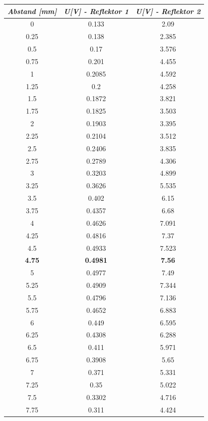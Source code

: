 \documentclass[a4paper,12pt]{article}
\begin{document}
	\begin{longtable}[h]{|c|c|c|}
			\hline
			\multicolumn{1}{|l|}{\textit{Abstand [mm]}} & \multicolumn{1}{l|}{\textit{U[V] - Reflektor 1}} & \multicolumn{1}{l|}{\textit{U[V] - Reflektor 2}} \\ \hline
			0 & 0.133 & 2.09 \\ \hline
			0.25 & 0.138 & 2.385 \\ \hline
			0.5 & 0.17 & 3.576 \\ \hline
			0.75 & 0.201 & 4.455 \\ \hline
			1 & 0.2085 & 4.592 \\ \hline
			1.25 & 0.2 & 4.258 \\ \hline
			1.5 & 0.1872 & 3.821 \\ \hline
			1.75 & 0.1825 & 3.503 \\ \hline
			2 & 0.1903 & 3.395 \\ \hline
			2.25 & 0.2104 & 3.512 \\ \hline
			2.5 & 0.2406 & 3.835 \\ \hline
			2.75 & 0.2789 & 4.306 \\ \hline
			3 & 0.3203 & 4.899 \\ \hline
			3.25 & 0.3626 & 5.535 \\ \hline
			3.5 & 0.402 & 6.15 \\ \hline
			3.75 & 0.4357 & 6.68 \\ \hline
			4 & 0.4626 & 7.091 \\ \hline
			4.25 & 0.4816 & 7.37 \\ \hline
			4.5 & 0.4933 & 7.523 \\ \hline
			\textbf{4.75} & \textbf{0.4981} & \textbf{7.56} \\ \hline
			5 & 0.4977 & 7.49 \\ \hline
			5.25 & 0.4909 & 7.344 \\ \hline
			5.5 & 0.4796 & 7.136 \\ \hline
			5.75 & 0.4652 & 6.883 \\ \hline
			6 & 0.449 & 6.595 \\ \hline
			6.25 & 0.4308 & 6.288 \\ \hline
			6.5 & 0.411 & 5.971 \\ \hline
			6.75 & 0.3908 & 5.65 \\ \hline
			7 & 0.371 & 5.331 \\ \hline
			7.25 & 0.35 & 5.022 \\ \hline
			7.5 & 0.3302 & 4.716 \\ \hline
			7.75 & 0.311 & 4.424 \\ \hline

\end{longtable}
\end{document}
